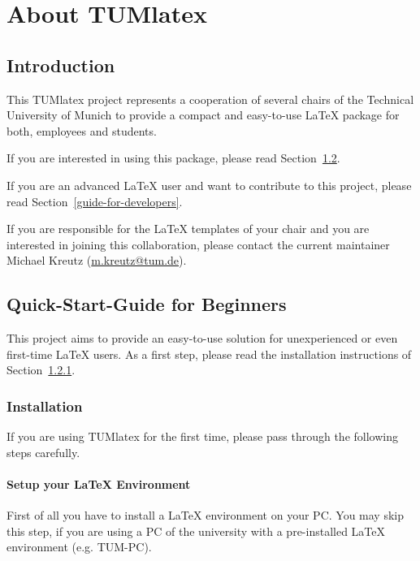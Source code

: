 \chapter{About TUMlatex}%

\section{Introduction}
This TUMlatex project represents a cooperation of several chairs of the Technical University of Munich to provide a compact and easy-to-use LaTeX package for both, employees and students.

If you are interested in using this package, please read Section~\ref{quick-start-guide}.

If you are an advanced LaTeX user and want to contribute to this project, please read Section~\ref{guide-for-developers}.

If you are responsible for the LaTeX templates of your chair and you are interested in joining this collaboration, please contact the current maintainer Michael Kreutz (\href{mailto:m.kreutz@tum.de}{m.kreutz@tum.de}).

\section{Quick-Start-Guide for Beginners}\label{quick-start-guide}
This project aims to provide an easy-to-use solution for unexperienced or even first-time LaTeX users. As a first step, please read the installation instructions of Section~\ref{installation}.

\subsection{Installation}\label{installation}

If you are using TUMlatex for the first time, please pass through the following steps carefully.

\subsubsection{Setup your LaTeX Environment}\label{setup-environment}

First of all you have to install a LaTeX environment on your PC.
You may skip this step, if you are using a PC of the university with a pre-installed LaTeX environment (e.g. TUM-PC).

